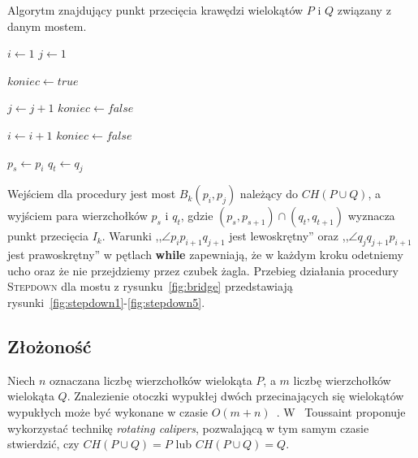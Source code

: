 \begin{algorithm}
  \caption{\label{alg:stepdown} Algorytm znajdujący punkt przecięcia
    krawędzi wielokątów $P$ i $Q$ związany z danym mostem.}
  \begin{algorithmic}[1]

    \State $i \gets 1$
    \State $j \gets 1$


    \Repeat
    \State $koniec \gets true$


    \State $j \gets j + 1$
    \State $koniec \gets false$
    \EndWhile


    \State $i \gets i + 1$
    \State $koniec \gets false$
    \EndWhile



    \State $p_s \gets p_i$
    \State $q_t \gets q_j$

    \EndProcedure
  \end{algorithmic}
\end{algorithm}

Wejściem dla procedury jest most $B_k(p_i,p_j)$ należący do $CH(P \cup
Q)$, a wyjściem para wierzchołków $p_s$ i $q_t$, gdzie $(p_s,p_{s+1})
\cap (q_t,q_{t+1})$ wyznacza punkt przecięcia $I_k$. Warunki ,,$\angle
p_{i}p_{i+1}q_{j+1}$ jest lewoskrętny'' oraz ,,$\angle
q_{j}q_{j+1}p_{i+1}$ jest prawoskrętny'' w pętlach \textbf{while}
zapewniają, że w każdym kroku odetniemy ucho oraz że nie przejdziemy
przez czubek żagla. Przebieg działania procedury \textsc{Stepdown} dla
mostu z rysunku~\ref{fig:bridge} przedstawiają
rysunki~\ref{fig:stepdown1}-\ref{fig:stepdown5}.

\subsection{Złożoność}
Niech $n$ oznaczana liczbę wierzchołków wielokąta $P$, a $m$ liczbę
wierzchołków wielokąta $Q$. Znalezienie otoczki wypukłej dwóch
przecinających się wielokątów wypukłych może być wykonane w czasie
$O(m + n)$~\cite{Toussaint83}. W~\cite{ToussaintInt} Toussaint
proponuje wykorzystać technikę \emph{rotating calipers}, pozwalającą w
tym samym czasie stwierdzić, czy $CH(P \cup Q) = P$ lub $CH(P \cup Q)
= Q$.

